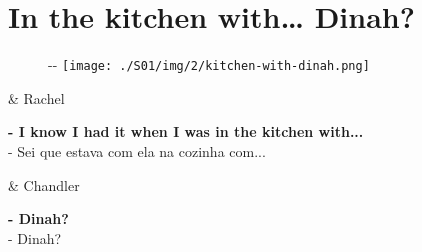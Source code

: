 \hypertarget{in-the-kitchen-with-dinah}{%
\section{In the kitchen with\ldots{}
Dinah?}\label{in-the-kitchen-with-dinah}}

\begin{figure}[!ht]
  \begin{adjustwidth}{-\oddsidemargin-1in}{-\rightmargin}
    \centering
    \texttt{[image: ./S01/img/2/kitchen-with-dinah.png]}
  \end{adjustwidth}
\end{figure}

\begin{tcolorbox}[enhanced,center upper,
    drop fuzzy shadow southeast, boxrule=0.3pt,
    lower separated=false, breakable,
    colframe=black!30!dialogoBorder,colback=white]
\begin{minipage}[c]{0.16\linewidth}
   & \centering \scriptsize{Rachel}
\end{minipage}
\hfill
\begin{minipage}[c]{0.8\linewidth}
  \textbf{- I know I had it when I was in the kitchen with...}\\
  - Sei que estava com ela na cozinha com...
\end{minipage}

\medskip
\begin{minipage}[c]{0.16\linewidth}
   & \centering \scriptsize{Chandler}
\end{minipage}
\hfill
\begin{minipage}[c]{0.8\linewidth}
  \textbf{- Dinah?}\\
  - Dinah?
\end{minipage}
\end{tcolorbox}


